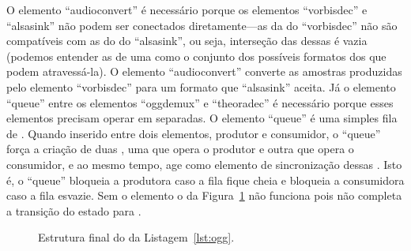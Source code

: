 \documentclass{SBCbookchapter}
\begin{document}
O elemento ``audioconvert'' é necessário porque os elementos ``vorbisdec'' e
``alsasink'' não podem ser conectados diretamente---as  da
 do ``vorbisdec'' não são compatíveis com as  do
 do ``alsasink'', ou seja, interseção das  dessas
 é vazia (podemos entender as  de uma  como o
conjunto dos possíveis formatos dos  que podem atravessá-la).
O elemento ``audioconvert'' converte as amostras produzidas pelo elemento
``vorbisdec'' para um formato que ``alsasink'' aceita.  Já o elemento
``queue'' entre os elementos ``oggdemux'' e ``theoradec'' é necessário
porque esses elementos precisam operar em  separadas.
O elemento ``queue'' é uma simples fila de .  Quando inserido
entre dois elementos, produtor e consumidor, o ``queue'' força a criação de
duas , uma que opera o produtor e outra que opera o
consumidor, e ao mesmo tempo, age como elemento de sincronização dessas
.  Isto é, o ``queue'' bloqueia a  produtora caso a
fila fique cheia e bloqueia a  consumidora caso a fila esvazie.
Sem o elemento  o  da Figura~\ref{fig:pipe-ogg} não
funciona pois não completa a transição do estado  para
.

\begin{figure}[H]
  \centering
  \caption{Estrutura final do  da Listagem~\ref{lst:ogg}.}
  \label{fig:pipe-ogg}
\end{figure}
\end{document}
